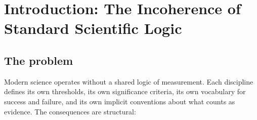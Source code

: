 \documentclass[
  aps,
  prd,
  twocolumn,
  superscriptaddress,
  nofootinbib,
  floatfix
]{revtex4-2}
\begin{document}
\maketitle

\section{Introduction: The Incoherence of Standard Scientific Logic}
\label{sec:intro}

\subsection{The problem}

Modern science operates without a shared logic of measurement.
Each discipline defines its own thresholds, its own significance
criteria, its own vocabulary for success and failure, and its own
implicit conventions about what counts as evidence.  The
consequences are structural:
\end{document}
